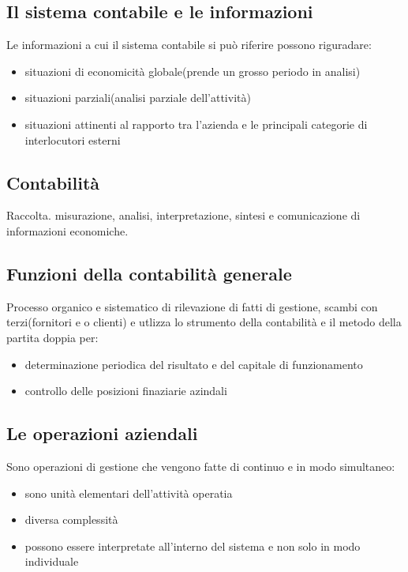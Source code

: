 \subsection{Il sistema contabile e le informazioni}
Le informazioni a cui il sistema contabile si può riferire possono riguradare:
\begin{itemize}
    \item situazioni di economicità globale(prende un grosso periodo in analisi)
    \item situazioni parziali(analisi parziale dell'attività)
    \item situazioni attinenti al rapporto tra l'azienda e le principali categorie di interlocutori esterni
\end{itemize}

\subsection{Contabilità}
Raccolta. misurazione, analisi, interpretazione, sintesi e comunicazione di informazioni
economiche.

\subsection{Funzioni della contabilità generale}
Processo organico e sistematico di rilevazione di fatti di gestione,
scambi con terzi(fornitori e o clienti) e utlizza lo strumento della contabilità
e il metodo della partita doppia per:
\begin{itemize}
    \item determinazione periodica del risultato e del capitale di funzionamento
    \item controllo delle posizioni finaziarie azindali
\end{itemize}

\subsection{Le operazioni aziendali}
Sono operazioni di gestione che vengono fatte di continuo e in modo simultaneo:


\begin{itemize}
    \item sono unità elementari dell'attività operatia
    \item diversa complessità
    \item possono essere interpretate all'interno del sistema e non solo in modo individuale
\end{itemize}

